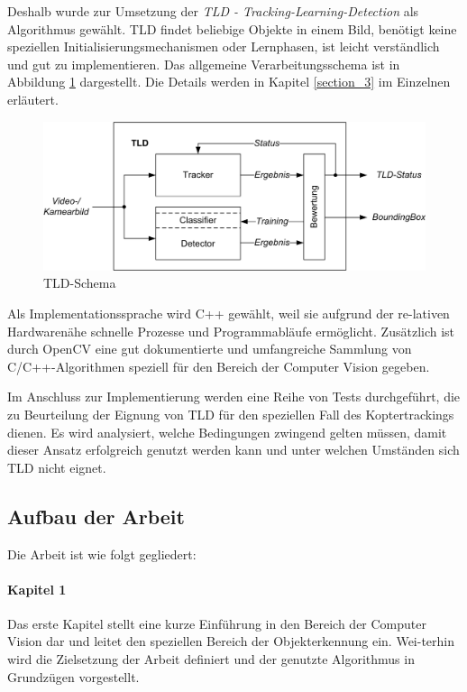 Deshalb wurde zur Umsetzung der \textit{TLD - Tracking-Learning-Detection} \cite{TLD} als Algorithmus gewählt. TLD findet beliebige Objekte in einem Bild, benötigt keine speziellen Initialisierungsmechanismen oder Lernphasen, ist leicht verständlich und gut zu implementieren. Das allgemeine Verarbeitungsschema ist in Abbildung \ref{TLD-Schema} dargestellt. Die Details werden in Kapitel \ref{section_3} im Einzelnen erläutert.

\begin{figure}
\centering{}\includegraphics[scale=0.75]{../pictures/TLD-Framework.jpg}\caption{TLD-Schema}
\label{TLD-Schema}
\end{figure}

Als Implementationssprache wird C++ gewählt, weil sie aufgrund der re-lativen Hardwarenähe schnelle Prozesse und Programmabläufe ermöglicht. Zusätzlich ist durch OpenCV \cite{OCV} eine gut dokumentierte und umfangreiche Sammlung von C/C++-Algorithmen speziell für den Bereich der Computer Vision gegeben.

Im Anschluss zur Implementierung werden eine Reihe von Tests durchgeführt, die zu Beurteilung der Eignung von TLD für den speziellen Fall des Koptertrackings dienen. Es wird analysiert, welche Bedingungen zwingend gelten müssen, damit dieser Ansatz erfolgreich genutzt werden kann und unter welchen Umständen sich TLD nicht eignet.

\subsection{Aufbau der Arbeit}
Die Arbeit ist wie folgt gegliedert:

\paragraph{Kapitel 1}
  Das erste Kapitel stellt eine kurze Einführung in den Bereich der Computer Vision dar und leitet den speziellen Bereich der Objekterkennung ein. Wei-terhin wird die Zielsetzung der Arbeit definiert und der genutzte Algorithmus in Grundzügen vorgestellt.

